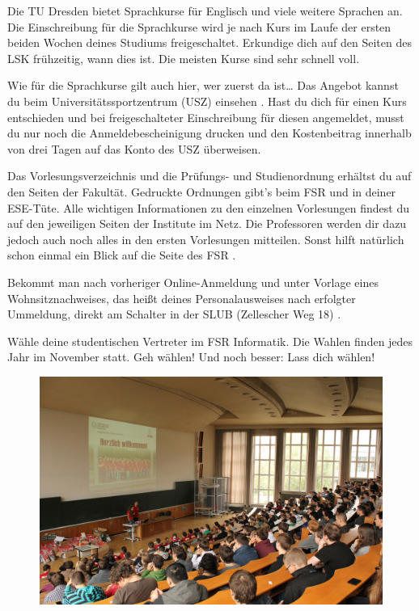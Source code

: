 \begin{itemize}[leftmargin=*]
Die TU Dresden bietet Sprachkurse für Englisch und viele weitere Sprachen an.
Die Einschreibung für die Sprachkurse wird je nach Kurs im Laufe der ersten
beiden Wochen deines Studiums freigeschaltet. Erkundige dich auf den Seiten des
LSK  frühzeitig, wann dies ist. Die
meisten Kurse sind sehr schnell voll.

Wie für die Sprachkurse gilt auch hier, wer zuerst da ist\ldots{} Das Angebot
kannst du beim Universitätssportzentrum (USZ) einsehen
. Hast du dich für einen Kurs entschieden und
bei freigeschalteter Einschreibung für diesen angemeldet, musst du nur noch die
Anmeldebescheinigung drucken und den Kostenbeitrag innerhalb von drei Tagen auf
das Konto des USZ überweisen.

\newpage

Das Vorlesungsverzeichnis
 und die Prüfungs- und
Studienordnung
 erhältst du
auf den Seiten der Fakultät. Gedruckte Ordnungen gibt's beim FSR und in deiner
ESE-Tüte. Alle wichtigen Informationen zu den einzelnen Vorlesungen findest du
auf den jeweiligen Seiten der Institute im Netz.  Die Professoren werden dir
dazu jedoch auch noch alles in den ersten Vorlesungen mitteilen. Sonst hilft
natürlich schon einmal ein Blick auf die Seite des FSR
.

Bekommt man nach vorheriger Online-Anmeldung und unter Vorlage eines
Wohnsitznachweises, das heißt deines Personalausweises nach erfolgter Ummeldung,
direkt am Schalter in der SLUB (Zellescher Weg 18)
.

Wähle deine studentischen Vertreter im FSR Informatik. Die Wahlen finden jedes
Jahr im November statt. Geh wählen! Und noch besser: Lass dich wählen!

\vfill

\begin{figure}[h!]
\centering
\includegraphics[width=0.9\linewidth]{img/ese2013/barschoe.jpg}
\end{figure}


\end{itemize}
